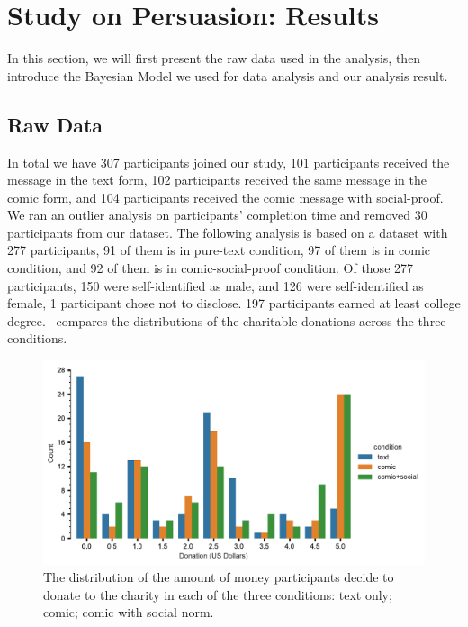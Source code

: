 \section{Study on Persuasion: Results}
\label{sec:Study on Behavior Results}

In this section, we will first present the raw data used in the analysis, then introduce the Bayesian Model we used for data analysis and our analysis result.

\subsection{Raw Data}
\label{sub:Study on Behavior Raw Data}
In total we have 307 participants joined our study, 101 participants received the message in the text form, 102 participants received the same message in the comic form, and 104 participants received the comic message with social-proof. We ran an outlier analysis on participants' completion time and removed 30 participants from our dataset. The following analysis is based on a dataset with 277 participants, 91 of them is in pure-text condition, 97 of them is in comic condition, and 92 of them is in comic-social-proof condition. Of those 277 participants, 150 were self-identified as male, and 126 were self-identified as female, 1 participant chose not to disclose. 197 participants earned at least college degree.~ compares the distributions of the charitable donations across the three conditions.

\begin{figure}[htb]
	\includegraphics[width=1\textwidth]{./hari-code/contributions_across_conditions.pdf}
    \caption{The distribution of the amount of money participants decide to donate to the charity in each of the three conditions: text only; comic; comic with social norm.}
	\label{fig:contributions across conditions}
\end{figure}




